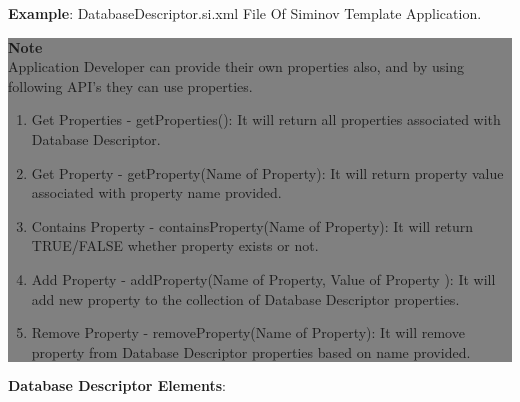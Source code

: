 

\newpage
\textbf{Example}: DatabaseDescriptor.si.xml File Of Siminov Template Application.



			\begin{center}
				\colorbox{grey}{
					\parbox[t]{.8\linewidth}{
						\fontsize{11pt}{11pt}\selectfont %
						\vspace*{0.1cm} %
		
						\hfill \textbf{Note} \\

			
						Application Developer can provide their own properties also, and by using following API's they can use properties.

						\hfill 	
						\begin{enumerate}
							\item \small Get Properties - getProperties(): It will return all properties associated with Database Descriptor.
							\item \small Get Property - getProperty(Name of Property): It will return property value associated with property name provided.
							\item \small Contains Property - containsProperty(Name of Property): It will return TRUE/FALSE whether property exists or not.
							\item \small Add Property - addProperty(Name of Property, Value of Property ): It will add new property to the  collection of Database Descriptor properties.
							\item \small Remove Property - removeProperty(Name of Property): It will remove property from Database Descriptor properties based on name provided.
						\end{enumerate}

						\vspace*{0.0cm} %
				}
			}

		\end{center}


\textbf{Database Descriptor Elements}: 


